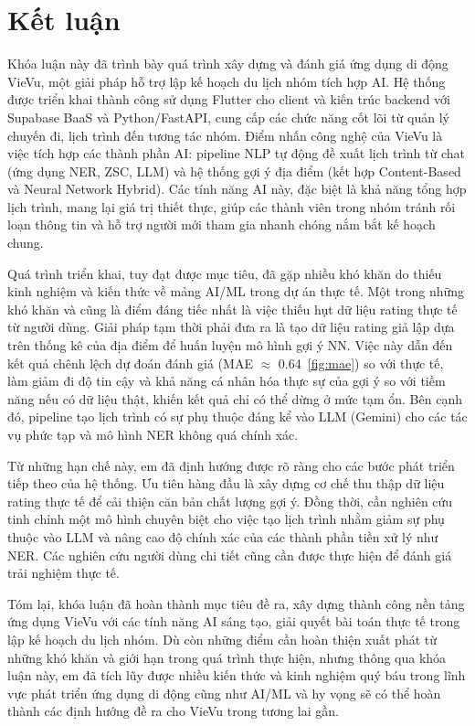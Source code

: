 \chapter*{Kết luận}

Khóa luận này đã trình bày quá trình xây dựng và đánh giá ứng dụng di động VieVu, một giải pháp hỗ trợ lập kế hoạch du lịch nhóm tích hợp AI. Hệ thống được triển khai thành công sử dụng Flutter cho client và kiến trúc backend với Supabase BaaS và Python/FastAPI, cung cấp các chức năng cốt lõi từ quản lý chuyến đi, lịch trình đến tương tác nhóm. Điểm nhấn công nghệ của VieVu là việc tích hợp các thành phần AI: pipeline NLP tự động đề xuất lịch trình từ chat (ứng dụng NER, ZSC, LLM) và hệ thống gợi ý địa điểm (kết hợp Content-Based và Neural Network Hybrid). Các tính năng AI này, đặc biệt là khả năng tổng hợp lịch trình, mang lại giá trị thiết thực, giúp các thành viên trong nhóm tránh rối loạn thông tin và hỗ trợ người mới tham gia nhanh chóng nắm bắt kế hoạch chung.

Quá trình triển khai, tuy đạt được mục tiêu, đã gặp nhiều khó khăn do thiếu kinh nghiệm và kiến thức về mảng AI/ML trong dự án thực tế. Một trong những khó khăn và cũng là điểm đáng tiếc nhất là việc thiếu hụt dữ liệu rating thực tế từ người dùng. Giải pháp tạm thời phải đưa ra là tạo dữ liệu rating giả lập dựa trên thống kê của địa điểm để huấn luyện mô hình gợi ý NN. Việc này dẫn đến kết quả chênh lệch dự đoán đánh giá (MAE $\approx$ 0.64~\ref{fig:mae}) so với thực tế, làm giảm đi độ tin cậy và khả năng cá nhân hóa thực sự của gợi ý so với tiềm năng nếu có dữ liệu thật, khiến kết quả chỉ có thể dừng ở mức tạm ổn. Bên cạnh đó, pipeline tạo lịch trình có sự phụ thuộc đáng kể vào LLM (Gemini) cho các tác vụ phức tạp và mô hình NER không quá chính xác.

Từ những hạn chế này, em đã định hướng được rõ ràng cho các bước phát triển tiếp theo của hệ thống. Ưu tiên hàng đầu là xây dựng cơ chế thu thập dữ liệu rating thực tế để cải thiện căn bản chất lượng gợi ý. Đồng thời, cần nghiên cứu tinh chỉnh một mô hình chuyên biệt cho việc tạo lịch trình nhằm giảm sự phụ thuộc vào LLM và nâng cao độ chính xác của các thành phần tiền xử lý như NER. Các nghiên cứu người dùng chi tiết cũng cần được thực hiện để đánh giá trải nghiệm thực tế.

Tóm lại, khóa luận đã hoàn thành mục tiêu đề ra, xây dựng thành công nền tảng ứng dụng VieVu với các tính năng AI sáng tạo, giải quyết bài toán thực tế trong lập kế hoạch du lịch nhóm. Dù còn những điểm cần hoàn thiện xuất phát từ những khó khăn và giới hạn trong quá trình thực hiện, nhưng thông qua khóa luận này, em đã tích lũy được nhiều kiến thức và kinh nghiệm quý báu trong lĩnh vực phát triển ứng dụng di động cũng như AI/ML và hy vọng sẽ có thể hoàn thành các định hướng đề ra cho VieVu trong tương lai gần.
